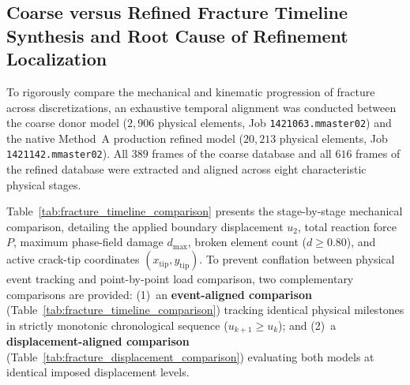 \subsection{Coarse versus Refined Fracture Timeline Synthesis and Root Cause of Refinement Localization}
\label{subsec:hole_timeline_synthesis}

To rigorously compare the mechanical and kinematic progression of fracture across discretizations, an exhaustive temporal alignment was conducted between the coarse donor model ($2{,}906$ physical elements, Job \texttt{1421063.mmaster02}) and the native Method~A production refined model ($20{,}213$ physical elements, Job \texttt{1421142.mmaster02}). All $389$ frames of the coarse database and all $616$ frames of the refined database were extracted and aligned across eight characteristic physical stages.

Table~\ref{tab:fracture_timeline_comparison} presents the stage-by-stage mechanical comparison, detailing the applied boundary displacement $u_2$, total reaction force $P$, maximum phase-field damage $d_{\max}$, broken element count ($d \ge 0.80$), and active crack-tip coordinates $(x_{\mathrm{tip}}, y_{\mathrm{tip}})$. To prevent conflation between physical event tracking and point-by-point load comparison, two complementary comparisons are provided: (1)~an \textbf{event-aligned comparison} (Table~\ref{tab:fracture_timeline_comparison}) tracking identical physical milestones in strictly monotonic chronological sequence ($u_{k+1} \ge u_k$); and (2)~a \textbf{displacement-aligned comparison} (Table~\ref{tab:fracture_displacement_comparison}) evaluating both models at identical imposed displacement levels.


